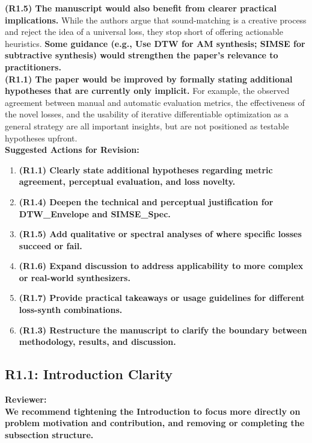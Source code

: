 \documentclass[11pt]{article}
\begin{document}
\textbf{(R1.5) The manuscript would also benefit from clearer practical implications.} While the authors argue that sound-matching is a creative process and reject the idea of a universal loss, they stop short of offering actionable heuristics. \textbf{Some guidance (e.g., Use DTW for AM synthesis; SIMSE for subtractive synthesis) would strengthen the paper’s relevance to practitioners.} \\
\textbf{(R1.1) The paper would be improved by formally stating additional hypotheses that are currently only implicit.} For example, the observed agreement between manual and automatic evaluation metrics, the effectiveness of the novel losses, and the usability of iterative differentiable optimization as a general strategy are all important insights, but are not positioned as testable hypotheses upfront. \\
\textbf{Suggested Actions for Revision:}
\begin{enumerate}
  \item \textbf{(R1.1) Clearly state additional hypotheses regarding metric agreement, perceptual evaluation, and loss novelty.}
  \item \textbf{(R1.4) Deepen the technical and perceptual justification for DTW\_Envelope and SIMSE\_Spec.}
  \item \textbf{(R1.5) Add qualitative or spectral analyses of where specific losses succeed or fail.}
  \item \textbf{(R1.6) Expand discussion to address applicability to more complex or real-world synthesizers.}
  \item \textbf{(R1.7) Provide practical takeaways or usage guidelines for different loss-synth combinations.}
  \item \textbf{(R1.3) Restructure the manuscript to clarify the boundary between methodology, results, and discussion.}
\end{enumerate}

\subsection*{R1.1: Introduction Clarity}
\label{R1.1}
\noindent\textbf{Reviewer:}\\
\textbf{We recommend tightening the Introduction to focus more directly on problem motivation and contribution, and removing or completing the subsection structure.
\\}
\end{document}

